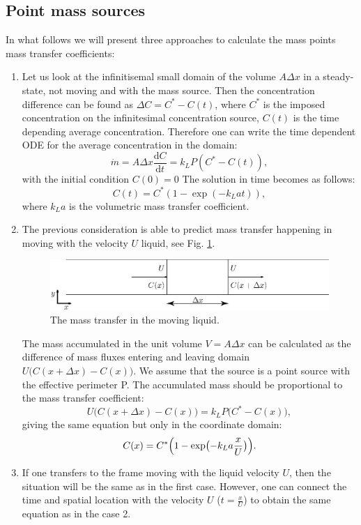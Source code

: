 \documentclass{article}
\newcommand{\beq}{\begin{equation}}
\newcommand{\feq}{\end{equation}}
\begin{document}
\subsection{Point mass sources}
In what follows we will present three approaches to calculate the mass points mass transfer
coefficients:
\begin{enumerate}
\item
Let us look at the infinitisemal small domain of the volume $A \Delta x$ in a steady-state, not
moving and with the mass source. Then the concentration difference can be found as $\Delta C = C^* -
C(t)$, where $C^*$ is the imposed concentration on the infinitesimal concentration source, $C(t)$ is
the time depending average concentration. Therefore one can write the time dependent ODE for the
average concentration in the domain:
\beq
\dot{m}= A \Delta x \frac{\mathrm{d}C}{\mathrm{d} t} = k_L P (C^{*}-C(t)), 
\feq
with the initial condition $C(0)=0$
The solution in time becomes as follows:
\beq
C(t)= C^{*}(1-\exp(-k_L a t )), 
\feq
where $k_L a$ is the volumetric mass transfer coefficient.

\item
The previous consideration is able to predict mass transfer happening in moving with the velocity
$U$ liquid, see Fig. \ref{fig:moving:frame}.
\begin{figure}[htb!]
\includegraphics[width=\textwidth]{Figures/mass_transfer.eps}
\caption{The mass transfer in the moving liquid. \label{fig:moving:frame}}
\end{figure}

The mass accumulated in the unit volume $V=A \Delta x$ can be calculated as the difference of 
mass fluxes entering and leaving domain $U \bigl(C(x+\Delta x)-C(x)\bigr)$. We assume that the
source is a point source with the effective perimeter P. The accumulated mass should be proportional
to the mass transfer coefficient:
\beq
U \bigl(C(x+\Delta x)-C(x)\bigr)=k_L P \bigl(C^{*}-C(x)\bigr), 
\feq 
giving the same equation but only in the coordinate domain:
\beq
C(x)= C^{*}\Bigl(1-\exp\bigl(-k_L a \frac{x}{U} \bigr)\Bigr).
\label{main:mass:transfer:expression} 
\feq

\item If one transfers to the frame moving with the liquid velocity $U$, then the situation will be
the same as in the first case. However, one can connect the time and spatial location with the
velocity $U$ ($t=\frac{x}{U}$) to obtain the same equation as in the case 2.
\end{enumerate}
\end{document}

